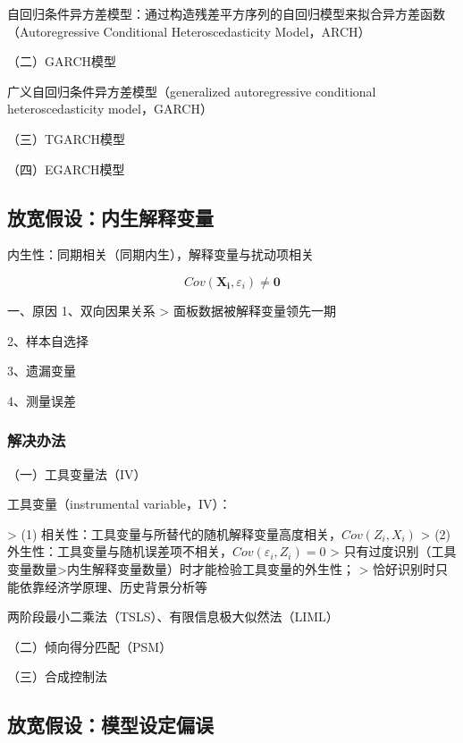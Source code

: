 \documentclass[12pt]{book}
\begin{document}
自回归条件异方差模型：通过构造残差平方序列的自回归模型来拟合异方差函数（Autoregressive Conditional Heteroscedasticity Model，ARCH）

（二）GARCH模型

广义自回归条件异方差模型（generalized autoregressive conditional heteroscedasticity model，GARCH）

（三）TGARCH模型

（四）EGARCH模型









\subsection{放宽假设：内生解释变量}








内生性：同期相关（同期内生），解释变量与扰动项相关

$$
Cov(\mathbf{X_i},\varepsilon_i)\neq\mathbf{0}
$$

一、原因
1、双向因果关系
> 面板数据被解释变量领先一期

2、样本自选择

3、遗漏变量

4、测量误差

\subsubsection{解决办法}

（一）工具变量法（IV）

工具变量（instrumental variable，IV）：

> (1) 相关性：工具变量与所替代的随机解释变量高度相关，$Cov(Z_i,X_i)$  
> (2) 外生性：工具变量与随机误差项不相关，$Cov(\varepsilon_i,Z_i)=0$  
> 只有过度识别（工具变量数量>内生解释变量数量）时才能检验工具变量的外生性；  
> 恰好识别时只能依靠经济学原理、历史背景分析等

两阶段最小二乘法（TSLS）、有限信息极大似然法（LIML）

（二）倾向得分匹配（PSM）

（三）合成控制法







\subsection{放宽假设：模型设定偏误}
\end{document}
